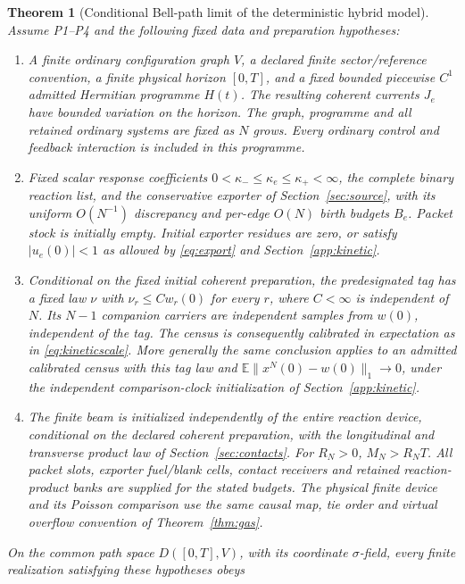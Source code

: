 \documentclass[11pt]{article}
\newtheorem{theorem}{Theorem}[section]
\theoremstyle{definition}\newtheorem{definition}[theorem]{Definition}
\theoremstyle{remark}\newtheorem{remark}[theorem]{Remark}
\newcommand{\E}{\mathbb E}\newcommand{\Prb}{\mathbb P}
\begin{document}
\begin{theorem}[Conditional Bell-path limit of the deterministic hybrid model]\label{thm:main}
Assume P1--P4 and the following fixed data and preparation hypotheses:
\begin{enumerate}[label=(\roman*)]
\item A finite ordinary configuration graph $V$, a declared finite
sector/reference convention, a finite physical horizon $[0,T]$, and a
fixed bounded piecewise $C^1$ admitted Hermitian programme $H(t)$.
The resulting coherent currents $J_e$ have bounded variation on the
horizon. The graph, programme and all retained ordinary systems are
fixed as $N$ grows. Every ordinary control and feedback interaction is
included in this programme.
\item Fixed scalar response coefficients
$0<\kappa_-\le\kappa_e\le\kappa_+<\infty$, the complete binary
reaction list, and the conservative exporter of
Section~\ref{sec:source}, with its uniform $O(N^{-1})$ discrepancy
and per-edge $O(N)$ birth budgets $B_e$. Packet stock is initially
empty. Initial exporter residues are zero, or satisfy $|u_e(0)|<1$ as
allowed by \eqref{eq:export} and Section~\ref{app:kinetic}.
\item Conditional on the fixed initial coherent preparation, the
predesignated tag has a fixed law $\nu$ with
$\nu_r\le Cw_r(0)$ for every $r$, where $C<\infty$ is independent
of $N$. Its $N-1$ companion carriers are independent samples from
$w(0)$, independent of the tag. The census is consequently calibrated
in expectation as in \eqref{eq:kineticscale}. More generally the
same conclusion applies to an admitted calibrated census with this
tag law and $\E\|x^N(0)-w(0)\|_1\to0$, under the independent
comparison-clock initialization of Section~\ref{app:kinetic}.
\item The finite beam is initialized independently of the entire
reaction device, conditional on the declared coherent preparation,
with the longitudinal and transverse product law of Section~\ref{sec:contacts}.
For $R_N>0$, $M_N>R_NT$. All packet slots, exporter fuel/blank
cells, contact receivers and retained reaction-product banks are
supplied for the stated budgets. The physical finite device and its
Poisson comparison use the same causal map, tie order and virtual
overflow convention of Theorem~\ref{thm:gas}.
\end{enumerate}
On the common path space $D([0,T],V)$, with its coordinate
$\sigma$-field, every finite realization satisfying these hypotheses obeys
\begin{equation}

\end{equation}
\end{theorem}
\end{document}
